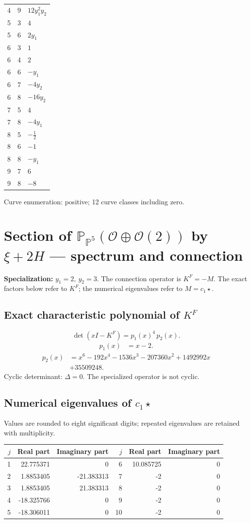 \documentclass[10pt,a4paper]{article}
\begin{document}
{\begin{longtable}{rrp{125mm}}
4 & 9 & $12 y_{1}^{2} y_{2}$\\
5 & 3 & $4$\\
5 & 6 & $2 y_{1}$\\
6 & 3 & $1$\\
6 & 4 & $2$\\
6 & 6 & $- y_{1}$\\
6 & 7 & $- 4 y_{2}$\\
6 & 8 & $- 16 y_{2}$\\
7 & 5 & $4$\\
7 & 8 & $- 4 y_{1}$\\
8 & 5 & $- \frac{1}{2}$\\
8 & 6 & $-1$\\
8 & 8 & $- y_{1}$\\
9 & 7 & $6$\\
9 & 8 & $-8$\\
\end{longtable}}
Curve enumeration: positive; 12 curve classes including zero.
\clearpage\section*{Section of $\mathbb P_{\mathbb P^{5}}(\mathcal O\oplus \mathcal O(2))$ by $\xi +2H$ --- spectrum and connection}
\textbf{Specialization:} $y_1=2,\ y_2=3$. The connection operator is $K^F=-M$. The exact factors below refer to $K^F$; the numerical eigenvalues refer to $M=c_1\star$.
\subsection*{Exact characteristic polynomial of $K^F$}
\[\det(xI-K^F)=p_{1}(x)^{4}\,p_{2}(x).\]
\[\begin{aligned}p_{1}(x)&=x - 2.\end{aligned}\]
\[\begin{aligned}p_{2}(x)&=x^{6} - 192 x^{4} - 1536 x^{3} - 207360 x^{2} + 1492992 x\\&+35509248.\end{aligned}\]
Cyclic determinant: $\Delta=0$. The specialized operator is not cyclic.
\subsection*{Numerical eigenvalues of $c_1\star$}
Values are rounded to eight significant digits; repeated eigenvalues are retained with multiplicity.
\begin{center}\small\begin{tabular}{rrr@{\qquad}rrr}\toprule $j$ & Real part & Imaginary part & $j$ & Real part & Imaginary part\\\midrule
1 & 22.775371 & 0 & 6 & 10.085725 & 0\\
2 & 1.8853405 & -21.383313 & 7 & -2 & 0\\
3 & 1.8853405 & 21.383313 & 8 & -2 & 0\\
4 & -18.325766 & 0 & 9 & -2 & 0\\
5 & -18.306011 & 0 & 10 & -2 & 0\\
\bottomrule\end{tabular}\end{center}
\end{document}
